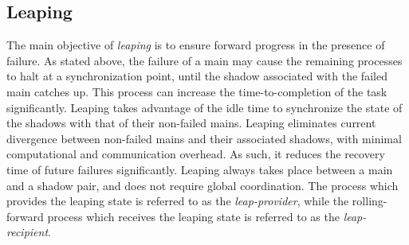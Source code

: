 \subsection{Leaping}

The main objective of \textit{leaping} is to ensure forward progress in the presence of failure. As stated above, the failure of a main may cause the remaining processes to halt at a synchronization point, until the shadow associated with the failed main catches up. This process can increase the time-to-completion of the task significantly. Leaping takes advantage of the idle time to synchronize the state of the shadows with that of their non-failed mains. 
Leaping eliminates current divergence between non-failed mains and their associated shadows, with minimal computational and communication overhead. As such, it reduces the recovery time of future failures significantly. 
Leaping always takes place between a main and a shadow pair, and does not require global coordination. The process which provides the leaping state is referred to as the 
\textit{leap-provider},  while the rolling-forward process which receives the leaping state is referred to as the \textit{leap-recipient}. 




